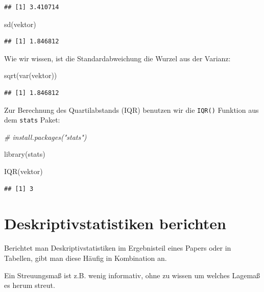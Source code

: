 \documentclass[
]{book}
\newenvironment{Shaded}{\begin{snugshade}}{\end{snugshade}}
\newcommand{\CommentTok}[1]{\textcolor[rgb]{0.56,0.35,0.01}{\textit{#1}}}
\newcommand{\FunctionTok}[1]{\textcolor[rgb]{0.00,0.00,0.00}{#1}}
\newcommand{\NormalTok}[1]{#1}
\begin{document}
\begin{verbatim}
## [1] 3.410714
\end{verbatim}

\begin{Shaded}
\begin{Highlighting}[]
\FunctionTok{sd}\NormalTok{(vektor)}
\end{Highlighting}
\end{Shaded}

\begin{verbatim}
## [1] 1.846812
\end{verbatim}

Wie wir wissen, ist die Standardabweichung die Wurzel aus der Varianz:

\begin{Shaded}
\begin{Highlighting}[]
\FunctionTok{sqrt}\NormalTok{(}\FunctionTok{var}\NormalTok{(vektor))}
\end{Highlighting}
\end{Shaded}

\begin{verbatim}
## [1] 1.846812
\end{verbatim}

Zur Berechnung des Quartilabstands (IQR) benutzen wir die \texttt{IQR()} Funktion aus dem \texttt{stats} Paket:

\begin{Shaded}
\begin{Highlighting}[]
\CommentTok{\# install.packages("stats")}

\FunctionTok{library}\NormalTok{(stats)}

\FunctionTok{IQR}\NormalTok{(vektor)}
\end{Highlighting}
\end{Shaded}

\begin{verbatim}
## [1] 3
\end{verbatim}

\hypertarget{deskriptivstatistiken-berichten}{%
\section{Deskriptivstatistiken berichten}\label{deskriptivstatistiken-berichten}}

Berichtet man Deskriptivstatistiken im Ergebnisteil eines Papers oder in Tabellen, gibt man diese Häufig in Kombination an.

Ein Streuungsmaß ist z.B. wenig informativ, ohne zu wissen um welches Lagemaß es herum streut.
\end{document}

